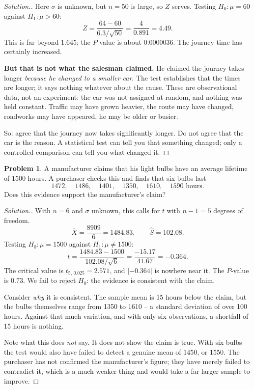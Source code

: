\documentclass[11pt,a4paper]{article}
\theoremstyle{definition}
\newtheorem{problemx}{Problem}[section]
\newenvironment{problem}{\begin{problemx}}{\end{problemx}}
\newenvironment{solution}
  {\renewcommand{\qedsymbol}{}\begin{proof}[\textit{Solution}.]}
  {\end{proof}}
\begin{document}
\begin{solution}
Here $\sigma$ is unknown, but $n=50$ is large, so $Z$ serves. Testing
$H_0:\mu=60$ against $H_1:\mu>60$:
\[Z=\frac{64-60}{6.3/\sqrt{50}}=\frac{4}{0.891}=4.49.\]
This is far beyond $1.645$; the $P$-value is about $0.0000036$. The journey time has
certainly increased.

\medskip
\textbf{But that is not what the salesman claimed.} He claimed the journey takes longer
\emph{because he changed to a smaller car}. The test establishes that the times are longer;
it says nothing whatever about the cause. These are observational data, not an experiment:
the car was not assigned at random, and nothing was held constant. Traffic may have grown
heavier, the route may have changed, roadworks may have appeared, he may be older or busier.

So: agree that the journey now takes significantly longer. Do not agree that the car is the
reason. A statistical test can tell you that something changed; only a controlled comparison
can tell you what changed it.
\end{solution}

\begin{problem}
A manufacturer claims that his light bulbs have an average lifetime of $1500$ hours. A
purchaser checks this and finds that six bulbs last
\[1472,\quad 1486,\quad 1401,\quad 1350,\quad 1610,\quad 1590 \text{ hours}.\]
Does this evidence support the manufacturer's claim?
\end{problem}

\begin{solution}
With $n=6$ and $\sigma$ unknown, this calls for $t$ with $n-1=5$ degrees of freedom.
\[\overline{X}=\frac{8909}{6}=1484.83, \qquad \hat{S}=102.08.\]
Testing $H_0:\mu=1500$ against $H_1:\mu\neq 1500$:
\[t=\frac{1484.83-1500}{102.08/\sqrt{6}}=\frac{-15.17}{41.67}=-0.364.\]
The critical value is $t_{5,\,0.025}=2.571$, and $|-0.364|$ is nowhere near it. The
$P$-value is $0.73$. We fail to reject $H_0$: the evidence is consistent with the claim.

\medskip
Consider \emph{why} it is consistent. The sample mean is 15 hours below the claim, but the
bulbs themselves range from 1350 to 1610 -- a standard deviation of over 100 hours. Against
that much variation, and with only six observations, a shortfall of 15 hours is nothing.

Note what this does \emph{not} say. It does not show the claim is true. With six bulbs the
test would also have failed to detect a genuine mean of 1450, or 1550. The purchaser has not
confirmed the manufacturer's figure; they have merely failed to contradict it, which is a
much weaker thing and would take a far larger sample to improve.
\end{solution}
\end{document}
